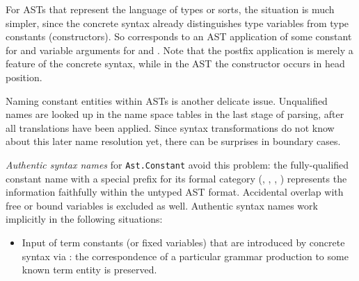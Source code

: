 \begin{isabellebody}
\begin{isamarkuptext}
  \medskip For ASTs that represent the language of types or sorts, the
  situation is much simpler, since the concrete syntax already
  distinguishes type variables from type constants (constructors).  So
   corresponds to an AST application of some
  constant for  and variable arguments for  and
  .  Note that the postfix application is merely a feature
  of the concrete syntax, while in the AST the constructor occurs in
  head position.%
\end{isamarkuptext}%
\isamarkuptrue%
%
\isamarkuptrue%
%
\begin{isamarkuptext}%
Naming constant entities within ASTs is another delicate
  issue.  Unqualified names are looked up in the name space tables in
  the last stage of parsing, after all translations have been applied.
  Since syntax transformations do not know about this later name
  resolution yet, there can be surprises in boundary cases.

  \emph{Authentic syntax names} for \verb|Ast.Constant| avoid this
  problem: the fully-qualified constant name with a special prefix for
  its formal category (, , , ) represents the information faithfully
  within the untyped AST format.  Accidental overlap with free or
  bound variables is excluded as well.  Authentic syntax names work
  implicitly in the following situations:

  \begin{itemize}

  \item Input of term constants (or fixed variables) that are
  introduced by concrete syntax via \hyperlink{command.notation}{\mbox{}}: the
  correspondence of a particular grammar production to some known term
  entity is preserved.


\end{itemize}
\end{isamarkuptext}
\end{isabellebody}
